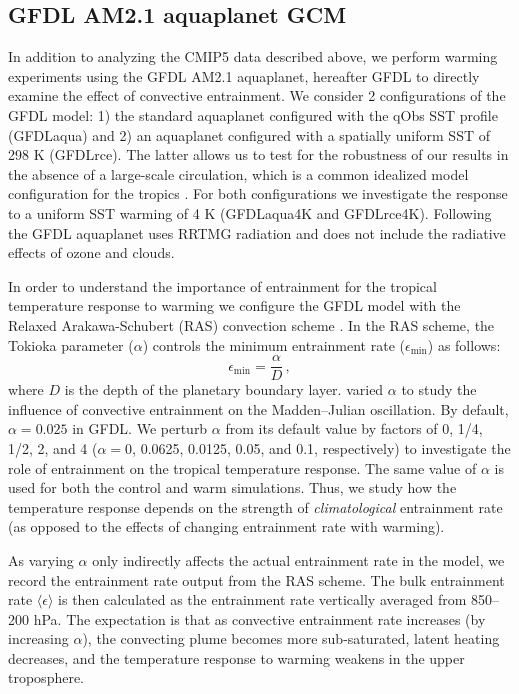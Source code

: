 \documentclass[draft]{agujournal2019}
\begin{document}
\subsection{GFDL AM2.1 aquaplanet GCM} \label{gfdl}
In addition to analyzing the CMIP5 data described above, we perform warming experiments using the GFDL AM2.1 aquaplanet, hereafter GFDL to directly examine the effect of convective entrainment. We consider 2 configurations of the GFDL model: 1) the standard aquaplanet configured with the qObs SST profile (GFDLaqua) \cite{neale-hoskins-2000} and 2) an aquaplanet configured with a spatially uniform SST of 298 K (GFDLrce). The latter allows us to test for the robustness of our results in the absence of a large-scale circulation, which is a common idealized model configuration for the tropics \cite{wing-et-al-2018}. For both configurations we investigate the response to a uniform SST warming of 4 K (GFDLaqua4K and GFDLrce4K). Following  the GFDL aquaplanet uses RRTMG radiation and does not include the radiative effects of ozone and clouds.

In order to understand the importance of entrainment for the tropical temperature response to warming we configure the GFDL model with the Relaxed Arakawa-Schubert (RAS) convection scheme \cite{moorthi-suarez-1992}. In the RAS scheme, the Tokioka parameter ($\alpha$) controls the minimum entrainment rate ($\epsilon_\mathrm{min}$) as follows:
\begin{equation}
\epsilon_{\mathrm{min}} = \frac{\alpha}{D} \, ,
\end{equation}
where $D$ is the depth of the planetary boundary layer.  varied $\alpha$ to study the influence of convective entrainment on the Madden--Julian oscillation. By default, $\alpha=0.025$ in GFDL. We perturb $\alpha$ from its default value by factors of 0, 1/4, 1/2, 2, and 4 ($\alpha=0$, 0.0625, 0.0125, 0.05, and 0.1, respectively) to investigate the role of entrainment on the tropical temperature response. The same value of $\alpha$ is used for both the control and warm simulations. Thus, we study how the temperature response depends on the strength of \textit{climatological} entrainment rate (as opposed to the effects of changing entrainment rate with warming).

As varying $\alpha$ only indirectly affects the actual entrainment rate in the model, we record the entrainment rate output from the RAS scheme. The bulk entrainment rate $\langle\epsilon\rangle$ is then calculated as the entrainment rate vertically averaged from 850--200 hPa. The expectation is that as convective entrainment rate increases (by increasing $\alpha$), the convecting plume becomes more sub-saturated, latent heating decreases, and the temperature response to warming weakens in the upper troposphere.
\end{document}
